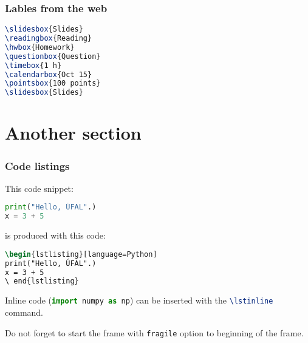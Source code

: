 \documentclass[handout,aspectratio=169]{beamer}
\begin{document}

\begin{frame}[fragile]
    \frametitle{Lables from the web}


    \begin{lstlisting}[language=TeX]
\slidesbox{Slides}
\readingbox{Reading}
\hwbox{Homework}
\questionbox{Question}
\timebox{1 h}
\calendarbox{Oct 15}
\pointsbox{100 points}
\slidesbox{Slides}
    \end{lstlisting}
\end{frame}

\section{Another section}


\begin{frame}[fragile]
    \frametitle{Code listings}

    This code snippet:
    \begin{lstlisting}[language=Python]
print("Hello, ÚFAL".)
x = 3 + 5
    \end{lstlisting}

    is produced with this code:
    \begin{lstlisting}[language=TeX]
\begin{lstlisting}[language=Python]
print("Hello, ÚFAL".)
x = 3 + 5
\ end{lstlisting}
    \end{lstlisting}

    Inline code (\lstinline[language=Python]{import numpy as np}) can be
    inserted with the \lstinline[language=TeX]{\lstinline} command.

    Do not forget to start the frame with \lstinline[language=TeX]{fragile}
    option to beginning of the frame.

\end{frame}
\end{document}
